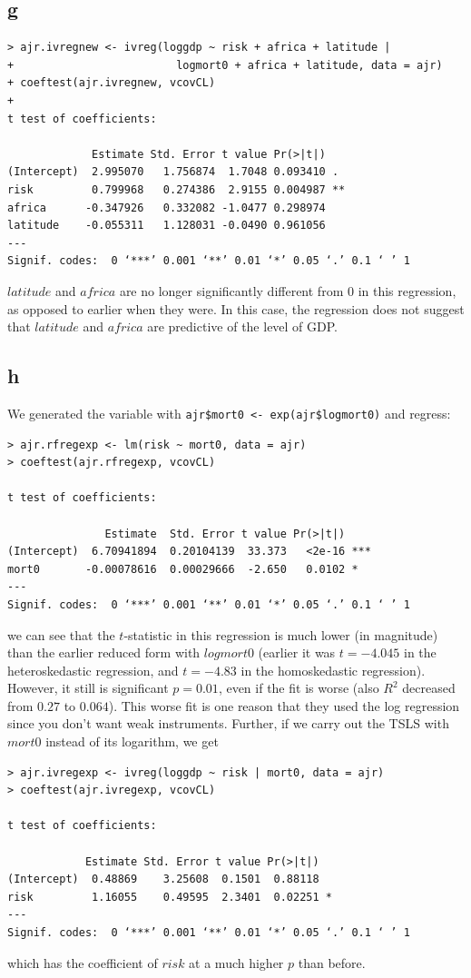 \documentclass[12pt,letterpaper]{article}
\theoremstyle{definition}
\begin{document}
\subsection*{g}

\begin{Verbatim}[fontsize=\small]
> ajr.ivregnew <- ivreg(loggdp ~ risk + africa + latitude |
+                         logmort0 + africa + latitude, data = ajr)
+ coeftest(ajr.ivregnew, vcovCL)
+
t test of coefficients:

             Estimate Std. Error t value Pr(>|t|)
(Intercept)  2.995070   1.756874  1.7048 0.093410 .
risk         0.799968   0.274386  2.9155 0.004987 **
africa      -0.347926   0.332082 -1.0477 0.298974
latitude    -0.055311   1.128031 -0.0490 0.961056
---
Signif. codes:  0 ‘***’ 0.001 ‘**’ 0.01 ‘*’ 0.05 ‘.’ 0.1 ‘ ’ 1
\end{Verbatim}
$latitude$ and $africa$ are no longer significantly different from $0$ in this regression, as opposed to earlier when they were. In this case, the regression does not suggest that $latitude$ and $africa$ are predictive of the level of GDP.

\subsection*{h}

We generated the variable with \verb|ajr$mort0 <- exp(ajr$logmort0)| and regress:
\begin{Verbatim}[fontsize=\small]
> ajr.rfregexp <- lm(risk ~ mort0, data = ajr)
> coeftest(ajr.rfregexp, vcovCL)

t test of coefficients:

               Estimate  Std. Error t value Pr(>|t|)
(Intercept)  6.70941894  0.20104139  33.373   <2e-16 ***
mort0       -0.00078616  0.00029666  -2.650   0.0102 *
---
Signif. codes:  0 ‘***’ 0.001 ‘**’ 0.01 ‘*’ 0.05 ‘.’ 0.1 ‘ ’ 1

\end{Verbatim}
we can see that the $t$-statistic in this regression is much lower (in magnitude) than the earlier reduced form with $logmort0$ (earlier it was $t = -4.045$ in the heteroskedastic regression, and $t = -4.83$ in the homoskedastic regression). However, it still is significant $p = 0.01$, even if the fit is worse (also $R^{2}$ decreased from $0.27$ to $0.064$). This worse fit is one reason that they used the log regression since you don't want weak instruments. Further, if we carry out the TSLS with $mort0$ instead of its logarithm, we get
\begin{Verbatim}[fontsize=\small]
> ajr.ivregexp <- ivreg(loggdp ~ risk | mort0, data = ajr)
> coeftest(ajr.ivregexp, vcovCL)

t test of coefficients:

            Estimate Std. Error t value Pr(>|t|)
(Intercept)  0.48869    3.25608  0.1501  0.88118
risk         1.16055    0.49595  2.3401  0.02251 *
---
Signif. codes:  0 ‘***’ 0.001 ‘**’ 0.01 ‘*’ 0.05 ‘.’ 0.1 ‘ ’ 1
\end{Verbatim}
which has the coefficient of $risk$ at a much higher $p$ than before.
\end{document}
